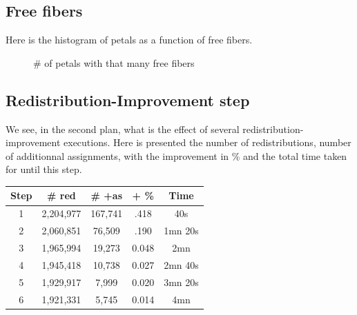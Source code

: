 \documentclass{extarticle}
\begin{document}
\begin{multicols}{2}

\subsection{Free fibers}
Here is the histogram of petals as a function of free fibers.
\begin{figure}[H]\begin{center}\caption{\# of petals with that many free fibers}
\end{center}\end{figure}
 

\subsection{Redistribution-Improvement step}
We see, in the second plan, what is the effect of several redistribution-improvement executions. Here is presented the number of redistributions, number of additionnal assignments, with the improvement in \% and the total time taken for until this step.

\begin{table}[H]\centering
	\begin{tabular}{c|cccc}
		Step & \# red & \# +as & + \% & Time \\ \hline
		1 & 2,204,977 & 167,741 & .418 & 40s\\
		2 & 2,060,851 & 76,509 & .190 & 1mn 20s\\
		3 & 1,965,994 & 19,273 & 0.048 & 2mn\\
		4 & 1,945,418 & 10,738 & 0.027 & 2mn 40s\\
		5 & 1,929,917 & 7,999 & 0.020 & 3mn 20s\\
		6 & 1,921,331 & 5,745 & 0.014 & 4mn\\
	\end{tabular}
\end{table}


\end{multicols}
\end{document}
